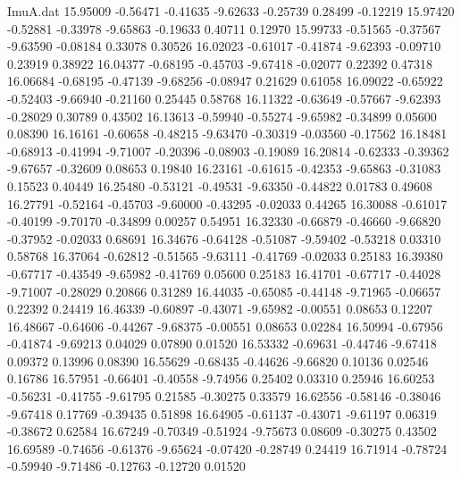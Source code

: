 \begin{filecontents}{ImuA.dat}
  15.95009   -0.56471   -0.41635   -9.62633   -0.25739    0.28499   -0.12219
  15.97420   -0.52881   -0.33978   -9.65863   -0.19633    0.40711    0.12970
  15.99733   -0.51565   -0.37567   -9.63590   -0.08184    0.33078    0.30526
  16.02023   -0.61017   -0.41874   -9.62393   -0.09710    0.23919    0.38922
  16.04377   -0.68195   -0.45703   -9.67418   -0.02077    0.22392    0.47318
  16.06684   -0.68195   -0.47139   -9.68256   -0.08947    0.21629    0.61058
  16.09022   -0.65922   -0.52403   -9.66940   -0.21160    0.25445    0.58768
  16.11322   -0.63649   -0.57667   -9.62393   -0.28029    0.30789    0.43502
  16.13613   -0.59940   -0.55274   -9.65982   -0.34899    0.05600    0.08390
  16.16161   -0.60658   -0.48215   -9.63470   -0.30319   -0.03560   -0.17562
  16.18481   -0.68913   -0.41994   -9.71007   -0.20396   -0.08903   -0.19089
  16.20814   -0.62333   -0.39362   -9.67657   -0.32609    0.08653    0.19840
  16.23161   -0.61615   -0.42353   -9.65863   -0.31083    0.15523    0.40449
  16.25480   -0.53121   -0.49531   -9.63350   -0.44822    0.01783    0.49608
  16.27791   -0.52164   -0.45703   -9.60000   -0.43295   -0.02033    0.44265
  16.30088   -0.61017   -0.40199   -9.70170   -0.34899    0.00257    0.54951
  16.32330   -0.66879   -0.46660   -9.66820   -0.37952   -0.02033    0.68691
  16.34676   -0.64128   -0.51087   -9.59402   -0.53218    0.03310    0.58768
  16.37064   -0.62812   -0.51565   -9.63111   -0.41769   -0.02033    0.25183
  16.39380   -0.67717   -0.43549   -9.65982   -0.41769    0.05600    0.25183
  16.41701   -0.67717   -0.44028   -9.71007   -0.28029    0.20866    0.31289
  16.44035   -0.65085   -0.44148   -9.71965   -0.06657    0.22392    0.24419
  16.46339   -0.60897   -0.43071   -9.65982   -0.00551    0.08653    0.12207
  16.48667   -0.64606   -0.44267   -9.68375   -0.00551    0.08653    0.02284
  16.50994   -0.67956   -0.41874   -9.69213    0.04029    0.07890    0.01520
  16.53332   -0.69631   -0.44746   -9.67418    0.09372    0.13996    0.08390
  16.55629   -0.68435   -0.44626   -9.66820    0.10136    0.02546    0.16786
  16.57951   -0.66401   -0.40558   -9.74956    0.25402    0.03310    0.25946
  16.60253   -0.56231   -0.41755   -9.61795    0.21585   -0.30275    0.33579
  16.62556   -0.58146   -0.38046   -9.67418    0.17769   -0.39435    0.51898
  16.64905   -0.61137   -0.43071   -9.61197    0.06319   -0.38672    0.62584
  16.67249   -0.70349   -0.51924   -9.75673    0.08609   -0.30275    0.43502
  16.69589   -0.74656   -0.61376   -9.65624   -0.07420   -0.28749    0.24419
  16.71914   -0.78724   -0.59940   -9.71486   -0.12763   -0.12720    0.01520

\end{filecontents}
